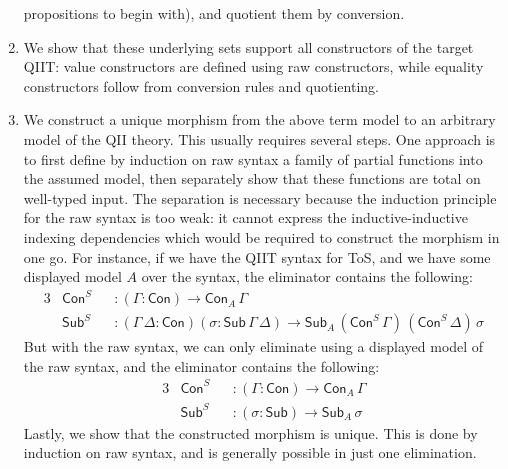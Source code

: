 \documentclass[12pt,a4paper,twoside,openany]{book}
\theoremstyle{remark}
\theoremstyle{definition}
\theoremstyle{theorem}
\newcommand{\Con}{\mathsf{Con}}
\newcommand{\Sub}{\mathsf{Sub}}
\begin{document}
\begin{enumerate}
    propositions to begin with), and quotient them by conversion.
  \item
    We show that these underlying sets support all constructors of the target
    QIIT: value constructors are defined using raw constructors, while
    equality constructors follow from conversion rules and quotienting.
  \item
    We construct a unique morphism from the above term model to an arbitrary
    model of the QII theory. This usually requires several steps. One approach
    is to first define by induction on raw syntax a family of partial
    functions into the assumed model, then separately show that these functions
    are total on well-typed input. The separation is necessary because the
    induction principle for the raw syntax is too weak: it cannot express
    the inductive-inductive indexing dependencies which would be required to
    construct the morphism in one go. For instance, if we have the QIIT syntax
    for ToS, and we have some displayed model $A$ over the syntax, the
    eliminator contains the following:
    \begin{alignat*}{3}
      &\Con^S &&: (\Gamma : \Con) \to \Con_A\,\Gamma \\
      &\Sub^S &&: (\Gamma\,\Delta : \Con)(\sigma : \Sub\,\Gamma\,\Delta) \to \Sub_{A}\,(\Con^S\,\Gamma)\,(\Con^S\,\Delta)\,\sigma
    \end{alignat*}
    But with the raw syntax, we can only eliminate using a displayed model of
    the raw syntax, and the eliminator contains the following:
    \begin{alignat*}{3}
      &\Con^S &&: (\Gamma : \Con) \to \Con_A\,\Gamma \\
      &\Sub^S &&: (\sigma : \Sub) \to \Sub_A\,\sigma
    \end{alignat*}
    Lastly, we show that the constructed morphism is unique. This is done by
    induction on raw syntax, and is generally possible in just one elimination.
\end{enumerate}
\end{document}
